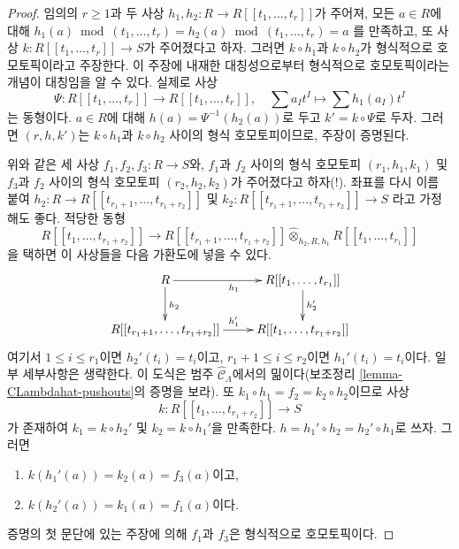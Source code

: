 \begin{proof}
임의의 $r \geq 1$과 두 사상
$h_1, h_2 : R \to R[[t_1, \ldots, t_r]]$가 주어져, 모든 $a \in R$에 대해
$h_1(a) \bmod (t_1, \ldots, t_r) =  h_2(a) \bmod (t_1, \ldots, t_r) = a$
를 만족하고, 또 사상 $k : R[[t_1, \ldots, t_r]] \to S$가 주어졌다고 하자.
그러면 $k \circ h_1$과 $k \circ h_2$가 형식적으로 호모토픽이라고 주장한다.
이 주장에 내재한 대칭성으로부터 형식적으로 호모토픽이라는 개념이
대칭임을 알 수 있다. 실제로 사상
$$
\Psi :
R[[t_1, \ldots, t_r]]
\longrightarrow
R[[t_1, \ldots, t_r]],\quad
\sum a_I t^I \longmapsto \sum h_1(a_I)t^I
$$
는 동형이다. $a \in R$에 대해 $h(a) = \Psi^{-1}(h_2(a))$로 두고
$k' = k \circ \Psi$로 두자. 그러면 $(r, h, k')$는 $k \circ h_1$과
$k \circ h_2$ 사이의 형식 호모토피이므로, 주장이 증명된다.

\medskip\noindent
위와 같은 세 사상 $f_1, f_2, f_3 : R \to S$와,
$f_1$과 $f_2$ 사이의 형식 호모토피 $(r_1, h_1, k_1)$ 및
$f_3$과 $f_2$ 사이의 형식 호모토피 $(r_2, h_2, k_2)$가 주어졌다고 하자(!).
좌표를 다시 이름 붙여
$h_2 : R \to R[[t_{r_1 + 1}, \ldots, t_{r_1 + r_2}]]$
및
$k_2 : R[[t_{r_1 + 1}, \ldots, t_{r_1 + r_2}]] \to S$
라고 가정해도 좋다. 적당한 동형
$$
R[[t_1, \ldots, t_{r_1 + r_2}]]
\longrightarrow
R[[t_{r_1 + 1}, \ldots, t_{r_1 + r_2}]]
\widehat{\otimes}_{h_2, R, h_1}
R[[t_1, \ldots, t_{r_1}]]
$$
을 택하면 이 사상들을 다음 가환도에 넣을 수 있다.
$$
\xymatrix{
R \ar[r]_{h_1} \ar[d]^{h_2} &
R[[t_1, \ldots, t_{r_1}]] \ar[d]^{h_2'} \\
R[[t_{r_1 + 1}, \ldots, t_{r_1 + r_2}]] \ar[r]^{h_1'} &
R[[t_1, \ldots, t_{r_1 + r_2}]]
}
$$
여기서 $1 \leq i \leq r_1$이면 $h_2'(t_i) = t_i$이고,
$r_1 + 1 \leq i \leq r_2$이면 $h_1'(t_i) = t_i$이다.
일부 세부사항은 생략한다. 이 도식은 범주
$\widehat{\mathcal{C}}_\Lambda$에서의 밂이다(보조정리
\ref{lemma-CLambdahat-pushouts}의 증명을 보라).
또 $k_1 \circ h_1 = f_2 = k_2 \circ h_2$이므로 사상
$$
k : R[[t_1, \ldots, t_{r_1 + r_2}]] \to S
$$
가 존재하여 $k_1 = k \circ h_2'$ 및 $k_2 = k \circ h_1'$을 만족한다.
$h = h_1' \circ h_2 = h_2' \circ h_1$로 쓰자. 그러면
\begin{enumerate}
\item $k(h_1'(a)) = k_2(a) = f_3(a)$이고,
\item $k(h_2'(a)) = k_1(a) = f_1(a)$이다.
\end{enumerate}
증명의 첫 문단에 있는 주장에 의해 $f_1$과 $f_3$은 형식적으로 호모토픽이다.
\end{proof}

